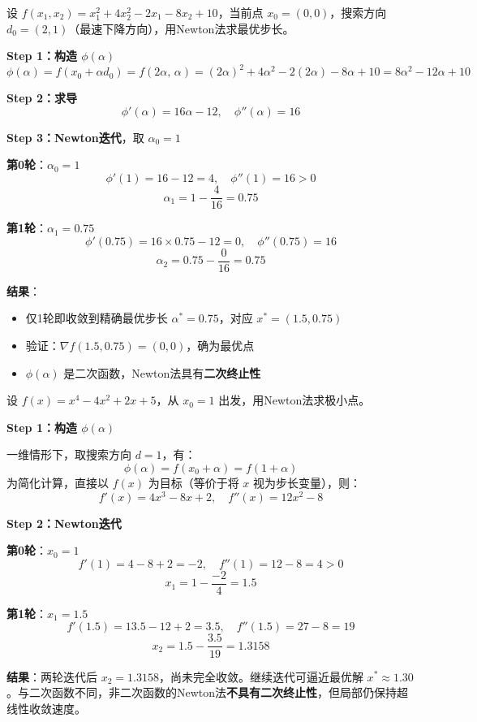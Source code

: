 \begin{example}\label{ex:newton}
设 $f(x_1, x_2) = x_1^2 + 4x_2^2 - 2x_1 - 8x_2 + 10$，当前点 $x_0 = (0, 0)$，搜索方向 $d_0 = (2, 1)$（最速下降方向），用Newton法求最优步长。

\textbf{Step 1：构造 $\phi(\alpha)$}
\[
\phi(\alpha) = f(x_0 + \alpha d_0) = f(2\alpha,\, \alpha) = (2\alpha)^2 + 4\alpha^2 - 2(2\alpha) - 8\alpha + 10 = 8\alpha^2 - 12\alpha + 10
\]

\textbf{Step 2：求导}
\[
\phi'(\alpha) = 16\alpha - 12,\quad \phi''(\alpha) = 16
\]

\textbf{Step 3：Newton迭代}，取 $\alpha_0 = 1$

\textbf{第0轮}：$\alpha_0 = 1$
\[
\phi'(1) = 16 - 12 = 4,\quad \phi''(1) = 16 > 0
\]
\[
\alpha_1 = 1 - \frac{4}{16} = 0.75
\]

\textbf{第1轮}：$\alpha_1 = 0.75$
\[
\phi'(0.75) = 16 \times 0.75 - 12 = 0,\quad \phi''(0.75) = 16
\]
\[
\alpha_2 = 0.75 - \frac{0}{16} = 0.75
\]

\textbf{结果}：
\begin{itemize}
    \item 仅1轮即收敛到精确最优步长 $\alpha^* = 0.75$，对应 $x^* = (1.5, 0.75)$
    \item 验证：$\nabla f(1.5, 0.75) = (0, 0)$，确为最优点
    \item $\phi(\alpha)$ 是二次函数，Newton法具有\textbf{二次终止性}
\end{itemize}
\end{example}

\begin{example}[Newton法对非二次函数]\label{ex:newton-nonquad}
设 $f(x) = x^4 - 4x^2 + 2x + 5$，从 $x_0 = 1$ 出发，用Newton法求极小点。

\textbf{Step 1：构造 $\phi(\alpha)$}

一维情形下，取搜索方向 $d = 1$，有：
\[
\phi(\alpha) = f(x_0 + \alpha) = f(1 + \alpha)
\]
为简化计算，直接以 $f(x)$ 为目标（等价于将 $x$ 视为步长变量），则：
\[
f'(x) = 4x^3 - 8x + 2,\quad f''(x) = 12x^2 - 8
\]

\textbf{Step 2：Newton迭代}

\textbf{第0轮}：$x_0 = 1$
\[
f'(1) = 4 - 8 + 2 = -2,\quad f''(1) = 12 - 8 = 4 > 0
\]
\[
x_1 = 1 - \frac{-2}{4} = 1.5
\]

\textbf{第1轮}：$x_1 = 1.5$
\[
f'(1.5) = 13.5 - 12 + 2 = 3.5,\quad f''(1.5) = 27 - 8 = 19
\]
\[
x_2 = 1.5 - \frac{3.5}{19} = 1.3158
\]

\textbf{结果}：两轮迭代后 $x_2 = 1.3158$，尚未完全收敛。继续迭代可逼近最优解 $x^* \approx 1.30$。与二次函数不同，非二次函数的Newton法\textbf{不具有二次终止性}，但局部仍保持超线性收敛速度。
\end{example}

